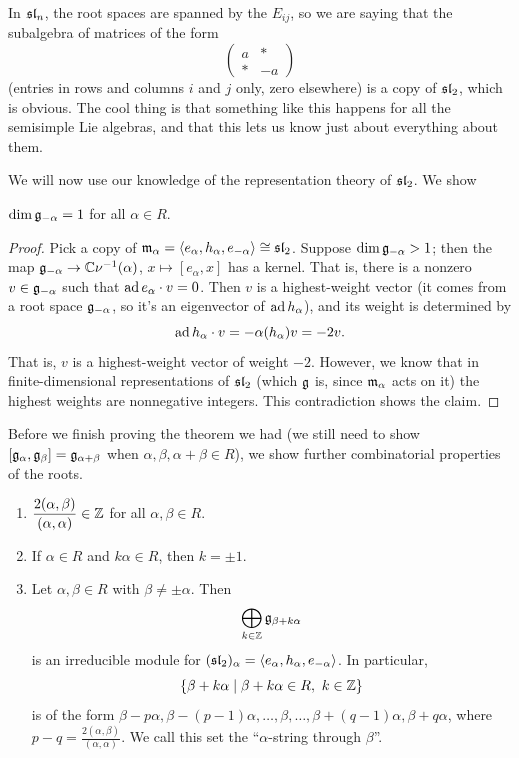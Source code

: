 \begin{remark}
In $\sl_n$, the root spaces are spanned by the $E_{ij}$, so we are saying that
the subalgebra of matrices of the form
\[
  \begin{pmatrix} a & * \\ * & -a \end{pmatrix}
\]
(entries in rows and columns $i$ and $j$ only, zero elsewhere) is a copy of
$\sl_2$,
which is obvious. The cool thing is that something like this happens for all
the semisimple Lie algebras, and that this lets us know just about everything
about them.
\end{remark}

We will now use our knowledge of the representation theory of $\sl_2$. We show

\begin{claim}
$\dim \g_{-\alpha} = 1$ for all $\alpha \in R$.
\end{claim}

\begin{proof}
Pick a copy of $\fm_\alpha = \langle e_\alpha, h_\alpha, e_{-\alpha}\rangle \cong \sl_2$.
Suppose $\dim \g_{-\alpha} > 1$; then the map $\g_{-\alpha} \to \C\nu^{-1}(\alpha)$,
$x \mapsto [e_\alpha, x]$ has a kernel. That is, there is a nonzero
$v \in \g_{-\alpha}$ such that $\ad e_\alpha \cdot v = 0$. Then $v$ is a
highest-weight vector (it comes from a root space $\g_{-\alpha}$, so it's an
eigenvector of $\ad h_\alpha$), and its weight is determined by
\[
  \ad h_\alpha \cdot v = -\alpha(h_\alpha)v = -2v.
\]
That is, $v$ is a highest-weight vector of weight $-2$. However, we know that
in finite-dimensional representations of $\sl_2$ (which $\g$ is, since
$\fm_\alpha$ acts on it) the highest weights are nonnegative integers. This
contradiction shows the claim.
\end{proof}

Before we finish proving the theorem we had (we still need to show
$[\g_\alpha, \g_\beta] = \g_{\alpha+\beta}$ when
$\alpha, \beta, \alpha + \beta \in R$), we show further combinatorial
properties of the roots.

\begin{theorem}\leavevmode
\begin{enumerate}
  \item $\dfrac{2(\alpha, \beta)}{(\alpha, \alpha)} \in \Z$ for all
    $\alpha, \beta \in R$.
  \item If $\alpha \in R$ and $k\alpha \in R$, then $k = \pm 1$.
  \item Let $\alpha, \beta \in R$ with $\beta \neq \pm\alpha$. Then
    \[
      \bigoplus_{k \in \Z} \g_{\beta + k\alpha}
    \]
    is an irreducible module for
    $(\sl_2)_\alpha = \langle e_\alpha, h_\alpha, e_{-\alpha}\rangle$. In
    particular,
    \[
      \setc{\beta + k\alpha}{\beta + k\alpha \in R,\ k \in \Z}
    \]
    is of the form
    $\beta - p\alpha, \beta - (p - 1)\alpha, \dots, \beta, \dots,
    \beta + (q - 1)\alpha, \beta + q\alpha$, where
    $p - q = \frac{2(\alpha, \beta)}{(\alpha, \alpha)}$. We call this set the
    ``$\alpha$-string through $\beta$''.
\end{enumerate}
\end{theorem}

